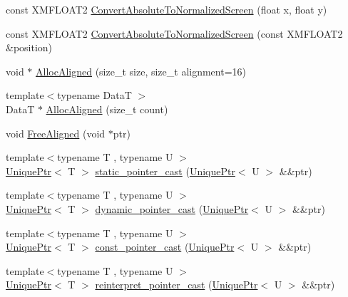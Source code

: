 \begin{DoxyCompactItemize}
\item 
const X\+M\+F\+L\+O\+A\+T2 \hyperlink{namespacemage_a98a82c6ca513d50f16d4ee6256fdac29}{Convert\+Absolute\+To\+Normalized\+Screen} (float x, float y)
\item 
const X\+M\+F\+L\+O\+A\+T2 \hyperlink{namespacemage_a9ef1aad29d7631ee2d88467faca6cc56}{Convert\+Absolute\+To\+Normalized\+Screen} (const X\+M\+F\+L\+O\+A\+T2 \&position)
\item 
void $\ast$ \hyperlink{namespacemage_a5bfc93e9988b3b967b2e0bbf9256eee2}{Alloc\+Aligned} (size\+\_\+t size, size\+\_\+t alignment=16)
\item 
{\footnotesize template$<$typename DataT $>$ }\\DataT $\ast$ \hyperlink{namespacemage_a8facb28d3867eefd618db6c859d349d5}{Alloc\+Aligned} (size\+\_\+t count)
\item 
void \hyperlink{namespacemage_a401c54df21447c491c527735647b5f80}{Free\+Aligned} (void $\ast$ptr)
\item 
{\footnotesize template$<$typename T , typename U $>$ }\\\hyperlink{namespacemage_a8c307fbcc33bce9b7f2aa4c26c3b95cf}{Unique\+Ptr}$<$ T $>$ \hyperlink{namespacemage_ae0907bba59d0d893d0a054661035998d}{static\+\_\+pointer\+\_\+cast} (\hyperlink{namespacemage_a8c307fbcc33bce9b7f2aa4c26c3b95cf}{Unique\+Ptr}$<$ U $>$ \&\&ptr)
\item 
{\footnotesize template$<$typename T , typename U $>$ }\\\hyperlink{namespacemage_a8c307fbcc33bce9b7f2aa4c26c3b95cf}{Unique\+Ptr}$<$ T $>$ \hyperlink{namespacemage_a4168eaa86aaac709097129979f0eb2e6}{dynamic\+\_\+pointer\+\_\+cast} (\hyperlink{namespacemage_a8c307fbcc33bce9b7f2aa4c26c3b95cf}{Unique\+Ptr}$<$ U $>$ \&\&ptr)
\item 
{\footnotesize template$<$typename T , typename U $>$ }\\\hyperlink{namespacemage_a8c307fbcc33bce9b7f2aa4c26c3b95cf}{Unique\+Ptr}$<$ T $>$ \hyperlink{namespacemage_a42610c173d3887debce8bd9750b02684}{const\+\_\+pointer\+\_\+cast} (\hyperlink{namespacemage_a8c307fbcc33bce9b7f2aa4c26c3b95cf}{Unique\+Ptr}$<$ U $>$ \&\&ptr)
\item 
{\footnotesize template$<$typename T , typename U $>$ }\\\hyperlink{namespacemage_a8c307fbcc33bce9b7f2aa4c26c3b95cf}{Unique\+Ptr}$<$ T $>$ \hyperlink{namespacemage_a4330d0ab25e88fd7417c098cfaeef36d}{reinterpret\+\_\+pointer\+\_\+cast} (\hyperlink{namespacemage_a8c307fbcc33bce9b7f2aa4c26c3b95cf}{Unique\+Ptr}$<$ U $>$ \&\&ptr)

\end{DoxyCompactItemize}
